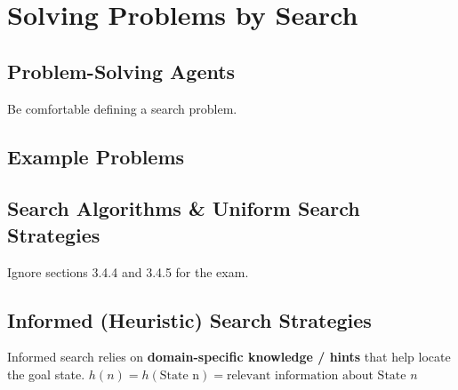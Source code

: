 \documentclass[exam={Midterm},color=true]{cs581exam}
\renewcommand{\emph}[1]{\textbf{#1}}
\begin{document}
\section{Solving Problems by Search}\label{sec:solving-problems-by-search}
\subsection{Problem-Solving Agents}\label{subsec:3.1}
Be comfortable defining a search problem.
\subsection{Example Problems}\label{subsec:3.2}
\subsection{Search Algorithms \& Uniform Search Strategies}\label{subsec:3.3-4}

Ignore sections 3.4.4 and 3.4.5 for the exam.
\setcounter{subsection}{4}%
\subsection{Informed (Heuristic) Search Strategies}\label{subsec:3.5}
Informed search relies on \emph{domain-specific knowledge / hints} that help locate the goal state.
$h(n)=h(\mbox{State n})=\mbox{relevant information about State } n$
\end{document}
